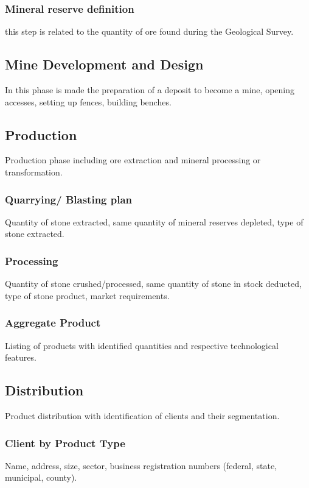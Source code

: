 \subsubsection{Mineral reserve definition}\label{sec:MineralReserve}
this step is related to the quantity of ore found during the Geological Survey.

\subsection{Mine Development and Design}\label{sec:MineDevelopment}
In this phase is made the preparation of a deposit to become a mine, opening accesses, setting up fences, building benches.

\subsection{Production}\label{sec:Production}
Production phase including ore extraction and mineral processing or transformation.

\subsubsection{Quarrying/ Blasting plan}\label{sec:Quarrying}
Quantity of stone extracted, same quantity of mineral reserves depleted, type of stone extracted.

\subsubsection{Processing}\label{sec:Processing}
Quantity of stone crushed/processed, same quantity of stone in stock deducted, type of stone product, market requirements.

\subsubsection{Aggregate Product}\label{sec:AggregateProduct}
Listing of products with identified quantities and respective technological features.

\subsection{Distribution}\label{sec:Distribution}
Product distribution with identification of clients and their segmentation. 

\subsubsection{Client by Product Type}\label{sec:Client}
Name, address, size, sector, business registration numbers (federal, state, municipal, county).

